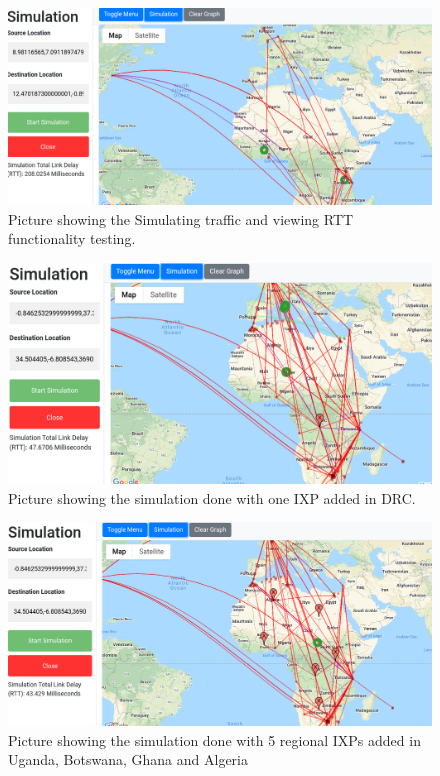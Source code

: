 \begin{figure}
    \begin{center}
        \includegraphics[width=1\linewidth]{sections/pictures-diagrams/simulateandrttpicture.png}
    \end{center}
    \caption{Picture showing the Simulating traffic and viewing RTT functionality testing.}
    \label{figure:state}
\end{figure}
\begin{figure}
    \begin{center}
        \includegraphics[width=1\linewidth]{sections/pictures-diagrams/OneIXPAdded.png}
    \end{center}
    \caption{Picture showing the simulation done with one IXP added in DRC.}
    \label{figure:state}
\end{figure}
\begin{figure}
    \begin{center}
        \includegraphics[width=1\linewidth]{sections/pictures-diagrams/5regionalIXPnodesadded.png}
    \end{center}
    \caption{Picture showing the simulation done with 5 regional IXPs added in Uganda, Botswana, Ghana and Algeria}
    \label{figure:state}
\end{figure}
